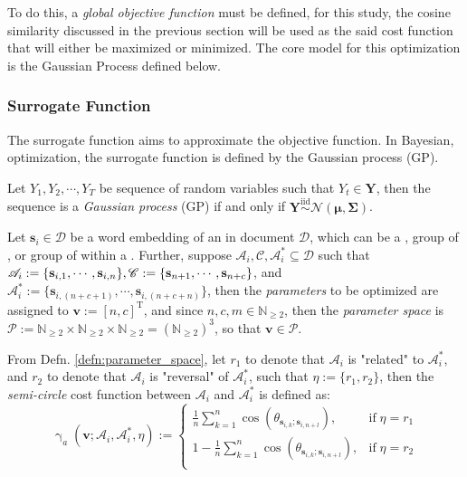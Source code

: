 To do this, a \textit{global objective function} must be defined, for this study, the cosine similarity discussed in the previous section will be used as the said cost function that will either be maximized or minimized. The core model for this optimization is the Gaussian Process defined below.
\subsubsection{Surrogate Function}
The surrogate function aims to approximate the objective function. In Bayesian, optimization, the surrogate function is defined by the Gaussian process (GP).
\begin{defnx}\label{defn:gp}
    Let $Y_1,Y_2,\cdots,Y_T$ be sequence of random variables such that $Y_t\in\mathbf{Y}$, then the sequence is a \textit{Gaussian process} (GP) if and only if $\mathbf{Y}\overset{\mathrm{iid}}{\sim}\mathcal{N}(\boldsymbol{\mu}, \boldsymbol{\Sigma})$.
\end{defnx}
\begin{defnx}\label{defn:parameter_space}
    Let $\mathbf{s}_i\in\mathscr{D}$ be a word embedding of an   in document $\mathscr{D}$, which can be a  , group of  , or group of   within a  . Further, suppose $\mathscr{A}_i,\mathscr{C},\mathscr{A}_i^{*}\subseteq\mathscr{D}$ such that $\mathscr{A}_i:=\{\mathbf{s}_{i,1},\cdots,\mathbf{s}_{i,n}\},\linebreak\mathscr{C}:=\{\mathbf{s}_{n+1},\cdots,\mathbf{s}_{n+c}\}$, and $\mathscr{A}_i^{*}:=\{\mathbf{s}_{i,(n+c+1)},\cdots,\mathbf{s}_{i,(n+c+n)}\}$, then the \textit{parameters} to be optimized are assigned to $\mathbf{v}:=[n,c]^{\text{T}}$, and since $n,c,m\in\mathbb{N}_{\geq 2}$, then the \textit{parameter space} is $\mathscr{P}:=\mathbb{N}_{\geq 2}\times\mathbb{N}_{\geq 2}\times\mathbb{N}_{\geq 2}=(\mathbb{N}_{\geq 2})^3$, so that $\mathbf{v}\in\mathscr{P}$. 
\end{defnx}
\begin{defnx}\label{defn:semi_circle_cost}
    From Defn. \ref{defn:parameter_space}, let $r_1$ to denote that $\mathscr{A}_i$ is "related" to $\mathscr{A}_i^{*}$, and $r_2$ to denote that $\mathscr{A}_i$ is "reversal" of $\mathscr{A}_i^{*}$, such that $\eta:=\{r_1,r_2\}$, then  the \textit{semi-circle} cost function between $\mathscr{A}_i$ and $\mathscr{A}_i^{*}$ is defined as:
    \begin{equation}
        \operatorname{\gamma}_{a}(\mathbf{v};\mathscr{A}_i,\mathscr{A}_i^{*},\eta):=\begin{cases}
            \frac{1}{n}\sum_{k=1}^{n}\cos\left(\theta_{\mathbf{s}_{i,k};\mathbf{s}_{i,n+l}}\right),&\text{if}\;\eta=r_1\\
            1-\frac{1}{n}\sum_{k=1}^{n}\cos\left(\theta_{\mathbf{s}_{i,k};\mathbf{s}_{i,n+l}}\right),&\text{if}\;\eta=r_2\\
        \end{cases}
    \end{equation}
\end{defnx}
